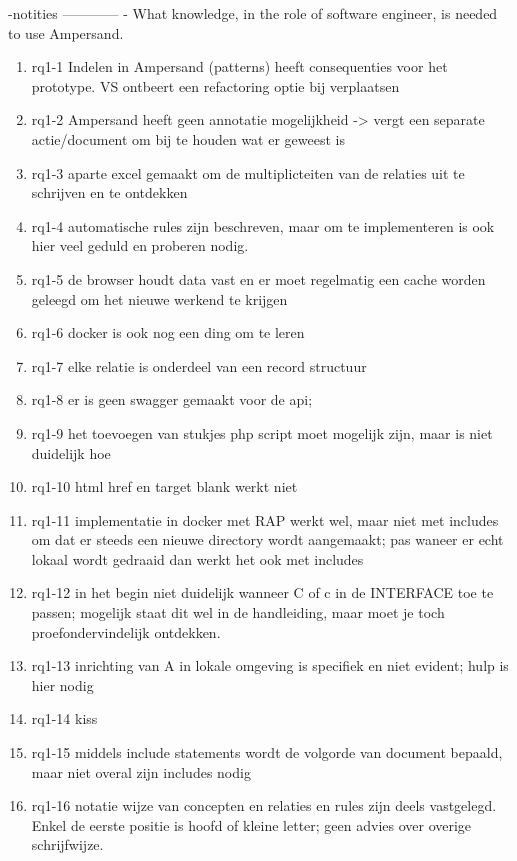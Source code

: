 -notities
\newline
------------
\newline
[RQ1]- What knowledge, in the role of software engineer, is needed to use Ampersand.
\begin{enumerate}
    \item rq1-1 Indelen in Ampersand (patterns) heeft consequenties voor het prototype. VS ontbeert een refactoring optie bij verplaatsen
    \item rq1-2 Ampersand heeft geen annotatie mogelijkheid -> vergt een separate actie/document om bij te houden wat er geweest is
    \item rq1-3 aparte excel gemaakt om de multiplicteiten van de relaties uit te schrijven en te ontdekken
    \item rq1-4 automatische rules zijn beschreven, maar om te implementeren is ook hier veel geduld en proberen nodig. 
    \item rq1-5 de browser houdt data vast en er moet regelmatig een cache worden geleegd om het nieuwe werkend te krijgen
    \item rq1-6 docker is ook nog een ding om te leren
    \item rq1-7 elke relatie is onderdeel van een record structuur
    \item rq1-8 er is geen swagger gemaakt voor de api; 
    \item rq1-9 het toevoegen van stukjes php script moet mogelijk zijn, maar is niet duidelijk hoe
    \item rq1-10 html href en target blank werkt niet
    \item rq1-11 implementatie in docker met RAP werkt wel, maar niet met includes om dat er steeds een nieuwe directory wordt aangemaakt; pas waneer er echt lokaal wordt gedraaid dan werkt het ook met includes
    \item rq1-12 in het begin niet duidelijk wanneer C of c in de INTERFACE toe te passen; mogelijk staat dit wel in de handleiding, maar moet je toch proefondervindelijk ontdekken.
    \item rq1-13 inrichting van A in lokale omgeving is specifiek en niet evident; hulp is hier nodig
    \item rq1-14 kiss
    \item rq1-15 middels include statements wordt de volgorde van document bepaald, maar niet overal zijn includes nodig
    \item rq1-16 notatie wijze van concepten en relaties en rules zijn deels vastgelegd. Enkel de eerste positie is hoofd of kleine letter; geen advies over overige schrijfwijze.

\end{enumerate}
